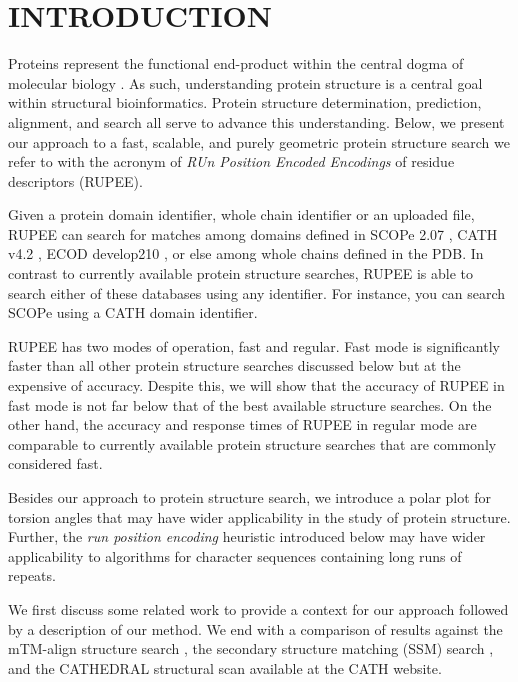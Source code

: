 \documentclass[a4,center,fleqn]{NAR}
\begin{document}
\section{INTRODUCTION}

Proteins represent the functional end-product within the central dogma of molecular biology \cite{Crick1970}.
As such, understanding protein structure is a central goal within structural bioinformatics. 
Protein structure determination, prediction, alignment, and search all serve to advance this understanding. 
Below, we present our approach to a fast, scalable, and purely geometric protein structure search we refer to with the acronym of \emph{RUn Position Encoded Encodings} of residue descriptors (RUPEE).

Given a protein domain identifier, whole chain identifier or an uploaded file, RUPEE can search for matches among domains defined in SCOPe 2.07 \cite{Fox2013}, CATH v4.2 \cite{Orengo1997}, ECOD develop210 \cite{Cheng2014}, or else among whole chains defined in the PDB.
In contrast to currently available protein structure searches, RUPEE is able to search either of these databases using any identifier. 
For instance, you can search SCOPe using a CATH domain identifier. 

RUPEE has two modes of operation, fast and regular. 
Fast mode is significantly faster than all other protein structure searches discussed below but at the expensive of accuracy.
Despite this, we will show that the accuracy of RUPEE in fast mode is not far below that of the best available structure searches. 
On the other hand, the accuracy and response times of RUPEE in regular mode are comparable to currently available protein structure searches that are commonly considered fast. 

Besides our approach to protein structure search, we introduce a polar plot for torsion angles that may have wider applicability in the study of protein structure. 
Further, the \emph{run position encoding} heuristic introduced below may have wider applicability to algorithms for character sequences containing long runs of repeats. 

We first discuss some related work to provide a context for our approach followed by a description of our method. 
We end with a comparison of results against the mTM-align structure search \cite{Dong2018}, the secondary structure matching (SSM) search \cite{Krissinel2004}, and the CATHEDRAL structural scan \cite{Redfern2007} available at the CATH website.

\enlargethispage{-65.1pt}
\end{document}

